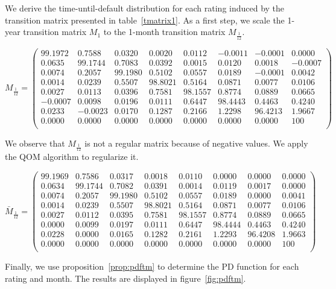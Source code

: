 \documentclass[11pt,fleqn]{book} %
\begin{document}
\begin{example}
	\label{ex:pdftm}
	We derive the time-until-default distribution for each rating induced by the 
	transition matrix presented in table~\ref{tmatrix1}. As a first step, we 
	scale the 1-year transition matrix $M_1$ to the 1-month transition matrix 
	$M_{\frac{1}{12}}$.
	{\small
	\begin{displaymath}
		M_{\frac{1}{12}} = \left(
		\begin{array}{cccccccc}
			99.1972 &  0.7588 &  0.0320 &  0.0020 &  0.0112 & -0.0011 & -0.0001 &   0.0000 \\
			 0.0635 & 99.1744 &  0.7083 &  0.0392 &  0.0015 &  0.0120 &  0.0018 &  -0.0007 \\
			 0.0074 &  0.2057 & 99.1980 &  0.5102 &  0.0557 &  0.0189 & -0.0001 &   0.0042 \\
			 0.0014 &  0.0239 &  0.5507 & 98.8021 &  0.5164 &  0.0871 &  0.0077 &   0.0106 \\
			 0.0027 &  0.0113 &  0.0396 &  0.7581 & 98.1557 &  0.8774 &  0.0889 &   0.0665 \\
			-0.0007 &  0.0098 &  0.0196 &  0.0111 &  0.6447 & 98.4443 &  0.4463 &   0.4240 \\
			 0.0233 & -0.0023 &  0.0170 &  0.1287 &  0.2166 &  1.2298 & 96.4213 &   1.9667 \\
			 0.0000 &  0.0000 &  0.0000 &  0.0000 &  0.0000 &  0.0000 &  0.0000 & 100 \\
		\end{array}
		\right)
	\end{displaymath}\par}
	We observe that $M_{\frac{1}{12}}$ is not a regular matrix because of 
	negative values. We apply the QOM algorithm to regularize it.
	{\small
	\begin{displaymath}
		\bar{M}_{\frac{1}{12}} = \left(
		\begin{array}{cccccccc}
			99.1969 &  0.7586 &  0.0317 &  0.0018 &  0.0110 &  0.0000 &  0.0000 &   0.0000 \\
			 0.0634 & 99.1744 &  0.7082 &  0.0391 &  0.0014 &  0.0119 &  0.0017 &   0.0000 \\
			 0.0074 &  0.2057 & 99.1980 &  0.5102 &  0.0557 &  0.0189 &  0.0000 &   0.0041 \\
			 0.0014 &  0.0239 &  0.5507 & 98.8021 &  0.5164 &  0.0871 &  0.0077 &   0.0106 \\
			 0.0027 &  0.0112 &  0.0395 &  0.7581 & 98.1557 &  0.8774 &  0.0889 &   0.0665 \\
			 0.0000 &  0.0099 &  0.0197 &  0.0111 &  0.6447 & 98.4444 &  0.4463 &   0.4240 \\
			 0.0228 &  0.0000 &  0.0165 &  0.1282 &  0.2161 &  1.2293 & 96.4208 &   1.9663 \\
			 0.0000 &  0.0000 &  0.0000 &  0.0000 &  0.0000 &  0.0000 &  0.0000 & 100 \\
		\end{array}
		\right)
	\end{displaymath}\par}
	Finally, we use proposition~\ref{prop:pdftm} to determine the 
	PD function for each rating and month. The results are displayed in 
	figure~\ref{fig:pdftm}.
\end{example}
\end{document}
